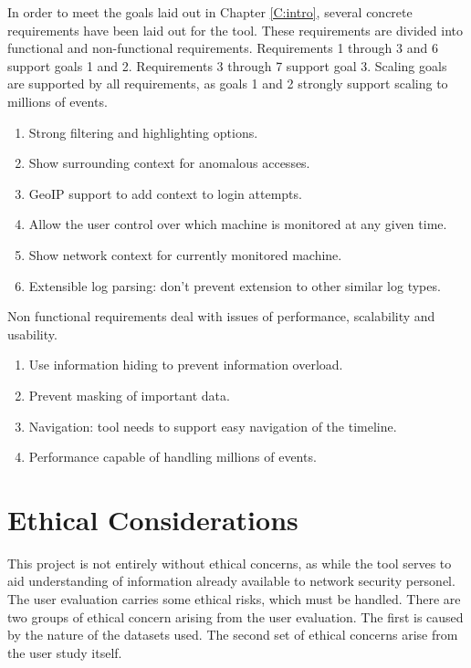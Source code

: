 In order to meet the goals laid out in Chapter \ref{C:intro}, several concrete requirements have been laid out for the tool. These requirements are divided into functional and non-functional requirements. Requirements 1 through 3 and 6 support goals 1 and 2. Requirements 3 through 7 support goal 3. Scaling goals are supported by all requirements, as goals 1 and 2 strongly support scaling to millions of events.  

\begin{enumerate}
\item{Strong filtering and highlighting options.}
\item{Show surrounding context for anomalous accesses.}
\item{GeoIP support to add context to login attempts.}
\item{Allow the user control over which machine is monitored at any given time.}
\item{Show network context for currently monitored machine.}
\item{Extensible log parsing: don't prevent extension to other similar log types.}
\end{enumerate}

Non functional requirements deal with issues of performance, scalability and usability.
\begin{enumerate}
\item{Use information hiding to prevent information overload.}
\item{Prevent masking of important data.}
\item{Navigation: tool needs to support easy navigation of the timeline.}
\item{Performance capable of handling millions of events.}
\end{enumerate}

\section{Ethical Considerations}

This project is not entirely without ethical concerns, as while the tool serves to aid understanding of information already available to network security personel. The user evaluation carries some ethical risks, which must be handled.
There are two groups of ethical concern arising from the user evaluation. The first is caused by the nature of the datasets used.  The second set of ethical concerns arise from the user study itself.

